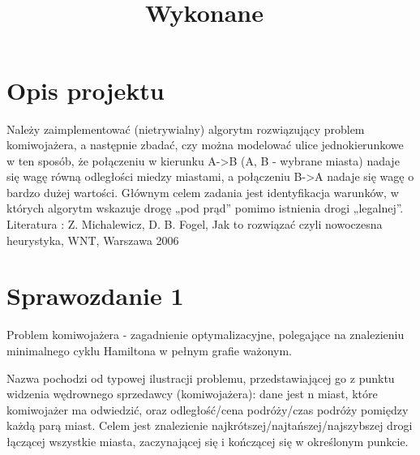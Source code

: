 \documentclass{article}
\title{
\vspace{2in}
\textmd{\textbf{\hmwkTitle}}\\
\normalsize\vspace{0.1in}\small{Wykonane\ \hmwkDueDate}\\
\vspace{0.1in}
\vspace{3in}
}
\author{\textbf{\hmwkAuthorName}}
\date{} %
\begin{document}
\maketitle



\newpage
\tableofcontents
\newpage


\section{Opis projektu}

Należy zaimplementować (nietrywialny) algorytm rozwiązujący problem komiwojażera, a następnie zbadać, czy można modelować ulice jednokierunkowe w ten sposób, że połączeniu w kierunku A->B (A, B - wybrane miasta) nadaje się wagę równą odległości miedzy miastami, a połączeniu B->A nadaje się wagę o bardzo dużej wartości. Głównym celem zadania jest identyfikacja warunków, w których algorytm wskazuje drogę „pod prąd” pomimo istnienia drogi „legalnej”. Literatura : Z. Michalewicz, D. B. Fogel, Jak to rozwiązać czyli nowoczesna heurystyka, WNT, Warszawa 2006
	
\section{Sprawozdanie 1}

Problem komiwojażera - zagadnienie optymalizacyjne, polegające na znalezieniu minimalnego cyklu Hamiltona w pełnym grafie ważonym.

Nazwa pochodzi od typowej ilustracji problemu, przedstawiającej go z punktu widzenia wędrownego sprzedawcy (komiwojażera): dane jest n miast, które komiwojażer ma odwiedzić, oraz odległość/cena podróży/czas podróży pomiędzy każdą parą miast. Celem jest znalezienie najkrótszej/najtańszej/najszybszej drogi łączącej wszystkie miasta, zaczynającej się i kończącej się w określonym punkcie.
\\
\end{document}
